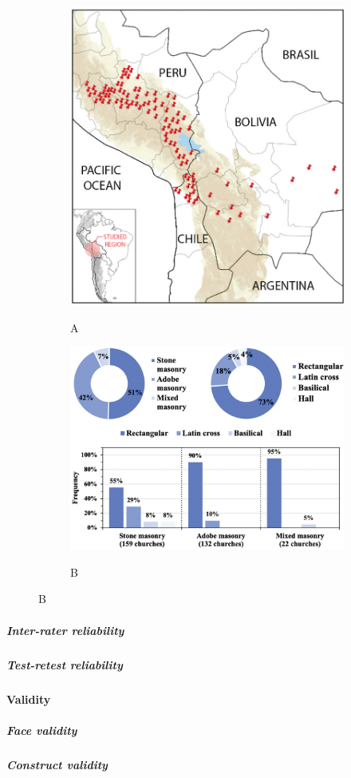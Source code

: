 \begin{figure}[ht]
  \caption{Figura con subfiguras}
  \label{fig:figura}
  \begin{subfigure}{0.35\textwidth}
      \centering
      \caption{A}
      \includegraphics[scale=0.28]{F_Figures/11_Chapter II/Cap2_Imagen2a.png}
      \label{fig:subfig1}
  \end{subfigure}
  \hfill
  \begin{subfigure}{0.55\textwidth}
      \centering
      \caption{B}
      \includegraphics[scale=0.28]{F_Figures/11_Chapter II/Cap2_Imagen2b.png}
      \label{fig:subfig2}
  \end{subfigure}
\end{figure}

\subparagraph{Inter-rater reliability}
\lipsum[10]

\subparagraph{Test-retest reliability}
\lipsum[11]

\paragraph{Validity}
\lipsum[12]

\subparagraph{Face validity}
\lipsum[13]

\subparagraph{Construct validity}